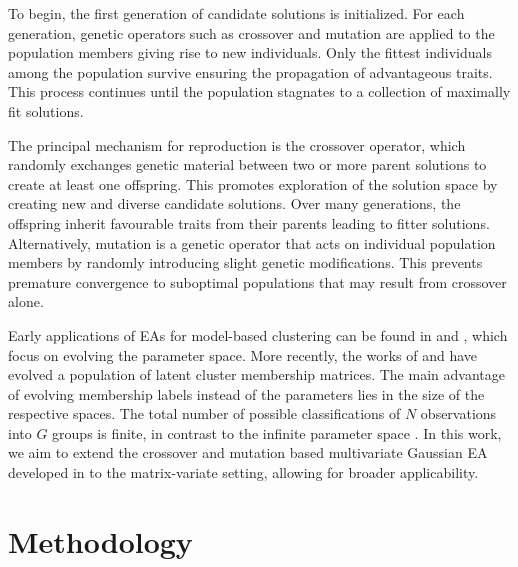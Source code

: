 \documentclass[12pt, centerh1]{article}
\begin{document}
To begin, the first generation of candidate solutions is initialized. For each generation, genetic operators such as crossover and mutation are applied to the population members giving rise to new individuals. Only the fittest individuals among the population survive ensuring the propagation of advantageous traits. This process continues until the population stagnates to a collection of maximally fit solutions. 

The principal mechanism for reproduction is the crossover operator, which randomly exchanges genetic material between two or more parent solutions to create at least one offspring. This promotes exploration of the solution space by creating new and diverse candidate solutions. Over many generations, the offspring inherit favourable traits from their parents leading to fitter solutions. Alternatively, mutation is a genetic operator that acts on individual population members by randomly introducing slight genetic modifications. This prevents premature convergence to suboptimal populations that may result from crossover alone. 

Early applications of EAs for model-based clustering can be found in \citet{martinez2000} and \citet{pernkopf2005}, which focus on evolving the parameter space. More recently, the works of \citet{andrews2013} and \citet{mcnicholas2020} have evolved a population of latent cluster membership matrices. The main advantage of evolving membership labels instead of the parameters lies in the size of the respective spaces. The total number of possible classifications of $N$ observations into $G$ groups is finite, in contrast to the infinite parameter space \citep{andrews2013}. In this work, we aim to extend the crossover and mutation based multivariate Gaussian EA developed in \citet{mcnicholas2020} to the matrix-variate setting, allowing for broader applicability.


\section{Methodology}

\end{document}
